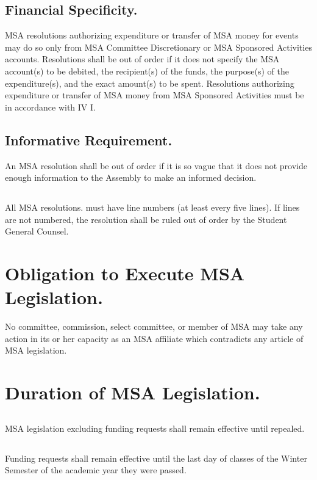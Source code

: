 \documentclass{rules}
\begin{document}
\subsection{Financial Specificity.}
MSA resolutions authorizing expenditure or transfer of MSA money for events may do so only from MSA Committee Discretionary or MSA Sponsored Activities accounts.  Resolutions shall be out of order if it does not specify the MSA account(s) to be debited, the recipient(s) of the funds, the purpose(s) of the expenditure(s), and the exact amount(s) to be spent. Resolutions authorizing expenditure or transfer of MSA money from MSA Sponsored Activities must be in accordance with IV I.
\subsection{Informative Requirement.}
An MSA resolution shall be out of order if it is so vague that it does not provide enough information to the Assembly to make an informed decision.
\subsection{}
All MSA resolutions. must have line numbers (at least every five lines).  If lines are not numbered, the resolution shall be ruled out of order by the Student General Counsel.

\section{Obligation to Execute MSA Legislation.}
No committee, commission, select committee, or member of MSA may take any action in its or her capacity as an MSA affiliate which contradicts any article of MSA legislation.

\section{Duration of MSA Legislation.}
\subsection{}
MSA legislation excluding funding requests shall remain effective until repealed.
\subsection{}
Funding requests shall remain effective until the last day of classes of the Winter Semester of the academic year they were passed.
\end{document}
